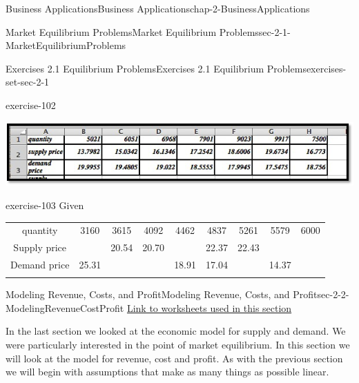 \documentclass[oneside,10pt,]{book}
\numberwithin{equation}{section}
\newcommand{\hrulethin}  {\noalign{\hrule height 0.04em}}
\newcommand{\hrulemedium}{\noalign{\hrule height 0.07em}}
\newcommand{\hrulethick} {\noalign{\hrule height 0.11em}}
\begin{document}
\begin{chapterptx}{Business Applications}{}{Business Applications}{}{}{chap-2-BusinessApplications}
\begin{sectionptx}{Market Equilibrium Problems}{}{Market Equilibrium Problems}{}{}{sec-2-1-MarketEquilibriumProblems}
\begin{exercises-subsection-numberless}{Exercises 2.1 Equilibrium Problems}{}{Exercises 2.1 Equilibrium Problems}{}{}{exercises-set-sec-2-1}
\begin{exercisegroup}
\begin{divisionexerciseeg}{11}{}{}{exercise-102}
\begin{enumerate}[label=(\alph*)]
\begin{sidebyside}{1}{0}{0}{0}
\begin{sbspanel}{1}
\includegraphics[width=1\linewidth]{images/sec2-1-sol11c.png}
\end{sbspanel}%
\end{sidebyside}%
\end{enumerate}
\end{divisionexerciseeg}%
\begin{divisionexerciseeg}{12}{}{}{exercise-103}%
\hypertarget{p-631}{}%
Given%
\begin{sidebyside}{1}{0}{0}{0}%
\begin{sbspanel}{1}%
{\centering%
\begin{tabular}{ccccccccc}\hrulethick
quantity&3160&3615&4092&4462&4837&5261&5579&6000\tabularnewline\hrulethin
Supply price&&20.54&20.70&&22.37&22.43&&\tabularnewline\hrulemedium
Demand price&25.31&&&18.91&17.04&&14.37&\tabularnewline\hrulemedium
\end{tabular}
\par}
\end{sbspanel}%
\end{sidebyside}%
\end{divisionexerciseeg}%
\end{exercisegroup}
\par\medskip\noindent
\end{exercises-subsection-numberless}
\end{sectionptx}
%
%
\typeout{************************************************}
\typeout{************************************************}
%
\begin{sectionptx}{Modeling Revenue, Costs, and Profit}{}{Modeling Revenue, Costs, and Profit}{}{}{sec-2-2-ModelingRevenueCostProfit}
\hypertarget{p-632}{}%
\href{./Examples/Section-2-2-Examples.xlsx}{Link to worksheets used in this section}%
\par
\hypertarget{p-633}{}%
In the last section we looked at the economic model for supply and demand.  We were particularly interested in the point of market equilibrium.  In this section we will look at the model for revenue, cost and profit.  As with the previous section we will begin with assumptions that make as many things as possible linear.%
\par
\hypertarget{p-634}{}%

\end{sectionptx}
\end{chapterptx}
\end{document}

